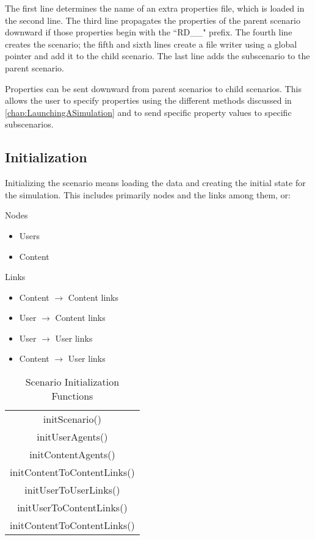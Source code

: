 The first line determines the name of an extra properties file, which is loaded in the second line. The third line propagates the properties of the parent scenario downward if those properties begin with the ``RD\_\_" prefix. The fourth line creates the scenario; the fifth and sixth lines create a file writer using a global pointer and add it to the child scenario. The last line adds the subscenario to the parent scenario.
	
\par Properties can be sent downward from parent scenarios to child scenarios. This allows the user to specify properties using the different methods discussed in \ref{chap:LaunchingASimulation} and to send specific property values to specific subscenarios.



\subsection{Initialization}
Initializing the scenario means loading the data and creating the initial state for the simulation. This includes primarily nodes and the links among them, or:
\par Nodes
   \begin{itemize} 
	\item Users
	\item Content
   \end {itemize}
\par Links
   \begin{itemize}
	\item Content $\rightarrow$ Content links
	\item User $\rightarrow$ Content links
	\item User $\rightarrow$ User links
	\item Content $\rightarrow$ User links
   \end{itemize}

\begin{table}[H]
\begin{center}
\caption{Scenario Initialization Functions}
\label{table:ScenarioInitializationFunctions}
\begin{adjustbox}{max width=1.1\textwidth,center}
\begin{tabular}{| c |}
\hline
initScenario() \\
initUserAgents() \\
initContentAgents() \\
initContentToContentLinks() \\
initUserToUserLinks() \\
initUserToContentLinks() \\
initContentToContentLinks() \\
\hline
\end{tabular}
\end{adjustbox}
\end{center}
\end{table}


